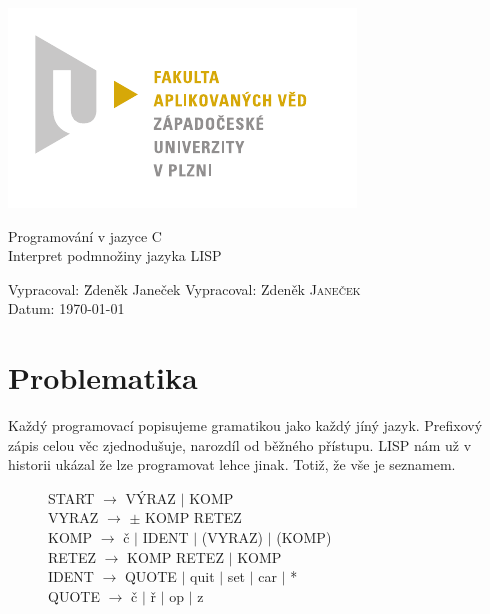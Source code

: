 \documentclass{article}
\begin{document}
\begin{titlepage}
\includegraphics[width=30ex]{fav_cmyk}
\vfill
\begin{center}
{\huge Programování v jazyce C}\\[2ex]
{\Large Interpret podmnožiny jazyka LISP}
\end{center}
\vfill
\begin{tabbing}
Vypracoval: \hspace{1ex}\=Zdeněk Janeček\kill
Vypracoval: \>Zdeněk \textsc{Janeček}\\
Datum:\> \today
\end{tabbing}
\end{titlepage}

\section{Problematika}
Každý programovací popisujeme gramatikou jako každý jíný jazyk.
Prefixový zápis celou věc zjednodušuje, narozdíl od běžného přístupu.
LISP nám už v historii ukázal že lze programovat lehce jinak.  Totiž,
že vše je seznamem.

\begin{figure}
START $\longrightarrow$ VÝRAZ $|$ KOMP\\
VYRAZ  $\longrightarrow$ $\pm$ KOMP RETEZ\\
KOMP  $\longrightarrow$ č $|$ IDENT $|$ (VYRAZ) $|$ (KOMP)\\
RETEZ  $\longrightarrow$ KOMP RETEZ $|$ KOMP\\
IDENT  $\longrightarrow$ QUOTE $|$ quit $|$ set $|$ car $|$ *\\
QUOTE  $\longrightarrow$ č $|$ ř $|$ op $|$ z
\end{figure}
\end{document}
